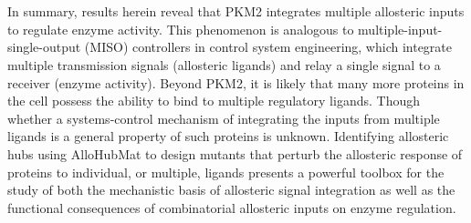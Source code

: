 %
%
\\\\
%
%
In summary, results herein reveal that PKM2 integrates multiple allosteric inputs to regulate enzyme activity. This phenomenon is analogous to multiple-input-single-output (MISO) controllers in control system engineering, which integrate multiple transmission signals (allosteric ligands) and relay a single signal to a receiver (enzyme activity). Beyond PKM2, it is likely that many more proteins in the cell possess the ability to bind to multiple regulatory ligands. Though whether a systems-control mechanism of integrating the inputs from multiple ligands is a general property of such proteins is unknown. Identifying allosteric hubs using AlloHubMat to design mutants that perturb the allosteric response of proteins to individual, or multiple, ligands presents a powerful toolbox for the study of both the mechanistic basis of allosteric signal integration as well as the functional consequences of combinatorial allosteric inputs on enzyme regulation. 


\clearpage

























